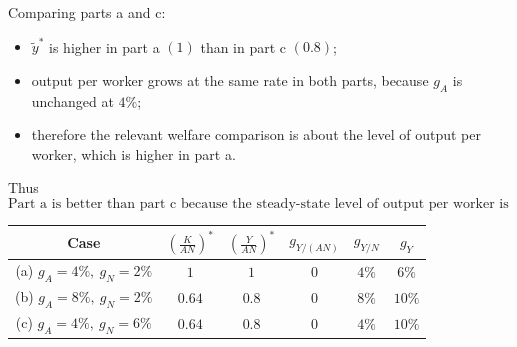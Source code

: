 \documentclass[12pt]{article}
\begin{document}
\begin{enumerate}[label=(\alph*)]
    Comparing parts a and c:
    \begin{itemize}[leftmargin=*]
        \item \(\tilde{y}^*\) is higher in part a \((1)\) than in part c \((0.8)\);
        \item output per worker grows at the same rate in both parts, because \(g_A\) is unchanged at \(4\%\);
        \item therefore the relevant welfare comparison is about the level of output per worker, which is higher in part a.
    \end{itemize}
    Thus
    \[
    \boxed{\text{Part a is better than part c because the steady-state level of output per worker is higher.}}
    \]
\end{enumerate}

\begin{center}
\renewcommand{\arraystretch}{1.25}
\begin{tabular}{|c|c|c|c|c|c|}
\hline
Case & \(\left(\frac{K}{AN}\right)^*\) & \(\left(\frac{Y}{AN}\right)^*\) & \(g_{Y/(AN)}\) & \(g_{Y/N}\) & \(g_Y\) \\
\hline
(a) \(g_A=4\%,\ g_N=2\%\) & \(1\) & \(1\) & \(0\) & \(4\%\) & \(6\%\) \\
(b) \(g_A=8\%,\ g_N=2\%\) & \(0.64\) & \(0.8\) & \(0\) & \(8\%\) & \(10\%\) \\
(c) \(g_A=4\%,\ g_N=6\%\) & \(0.64\) & \(0.8\) & \(0\) & \(4\%\) & \(10\%\) \\
\hline
\end{tabular}
\end{center}
\end{document}

